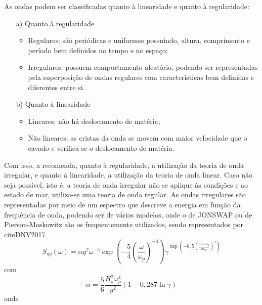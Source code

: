 As ondas podem ser classificadas quanto à linearidade e quanto à regularidade:
\begin{itemize}
	\item[a)] Quanto à regularidade
	\begin{itemize}
		\item Regulares: são periódicas e uniformes possuindo, altura, comprimento e período bem definidos no tempo e no espaço;

		\item Irregulares: possuem comportamento aleatório, podendo ser representadas pela superposição de ondas regulares com características bem definidas e diferentes entre si.
	\end{itemize}

	\item[b)] Quanto à linearidade

	\begin{itemize}
		\item Lineares: não há deslocamento de matéria;
		\item Não lineares: as cristas da onda se movem com maior velocidade que o cavado e verifica-se o deslocamento de matéria.
	\end{itemize}
\end{itemize}

Com isso, a  recomenda, quanto à regularidade, a utilização da teoria de onda irregular, e quanto à linearidade, a utilização da teoria de onda linear.
Caso não seja possível, isto é, a teoria de onda irregular não se aplique às condições e ao estado de mar, utiliza-se uma teoria de onda regular.
As ondas irregulares são representadas por meio de um espectro que descreve a energia em função da frequência de onda, podendo ser de vários modelos, onde o de JONSWAP ou de Pierson-Moskowitz são os frequentemente utilizados, sendo representados por cite{DNV2017}
\begin{equation}
\label{eq:viv-eq2}
S_{\eta\eta}(\omega) = \alpha g^2 \omega^{-5} \exp\left(-\frac{5}{4}\left(\frac{\omega}{\omega_p}\right)^{-4}\right)\gamma^{\exp \left(-0,5\left(\frac{\omega-\omega_p}{\sigma \omega_p}\right)^2\right)}
\end{equation}
com
\begin{equation}
\label{eq:viv-eq3}
\alpha = \frac{5}{6} \frac{H_s^2 \omega_p^4}{g^2} \left(1- 0,287 \ln{\gamma}\right)
\end{equation}
onde

